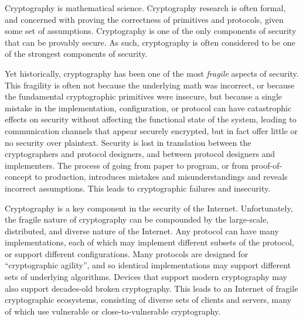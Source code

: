 
Cryptography is mathematical science. Cryptography research is often formal,
and concerned with proving the correctness of primitives and
protocols, given some set of assumptions. Cryptography is one of the only
components of security that can be provably secure. As such, cryptography is
often considered to be one of the strongest components of security.

Yet historically, cryptography has been one of the most \textit{fragile}
aspects of security. This fragility is often not because the underlying math
was incorrect, or because the fundamental cryptographic primitives were
insecure, but because a single mistake in the implementation, configuration,
or protocol can have catastrophic effects on security without affecting the
functional state of the system, leading to communication channels that appear
securely encrypted, but in fact offer little or no security over plaintext.
Security is lost in translation between the cryptographers and protocol
designers, and between protocol designers and implementers. The process of
going from paper to program, or from proof-of-concept to production,
introduces mistakes and misunderstandings and reveals incorrect assumptions.
This leads to cryptographic failures and insecurity.


Cryptography is a key component in the security of the Internet.
Unfortunately, the fragile nature of cryptography can be compounded by the
large-scale, distributed, and diverse nature of the Internet. Any protocol
can have many implementations, each of which may implement different subsets
of the protocol, or support different configurations. Many protocols are
designed for ``cryptographic agility'', and so identical implementations may
support different sets of underlying algorithms. Devices that support modern
cryptography may also support decades-old broken cryptography. This leads to
an Internet of fragile cryptographic ecosystems, consisting of diverse sets
of clients and servers, many of which use vulnerable or close-to-vulnerable
cryptography.


